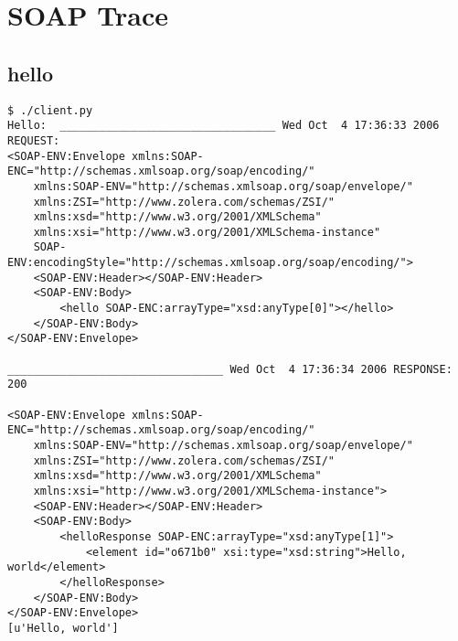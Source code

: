 \section{SOAP Trace}
\subsection{hello}
\begin{verbatim}
$ ./client.py 
Hello:  _________________________________ Wed Oct  4 17:36:33 2006 REQUEST:
<SOAP-ENV:Envelope xmlns:SOAP-ENC="http://schemas.xmlsoap.org/soap/encoding/" 
	xmlns:SOAP-ENV="http://schemas.xmlsoap.org/soap/envelope/" 
	xmlns:ZSI="http://www.zolera.com/schemas/ZSI/" 
	xmlns:xsd="http://www.w3.org/2001/XMLSchema" 
	xmlns:xsi="http://www.w3.org/2001/XMLSchema-instance" 
	SOAP-ENV:encodingStyle="http://schemas.xmlsoap.org/soap/encoding/">
	<SOAP-ENV:Header></SOAP-ENV:Header>
	<SOAP-ENV:Body>
		<hello SOAP-ENC:arrayType="xsd:anyType[0]"></hello>
	</SOAP-ENV:Body>
</SOAP-ENV:Envelope>

_________________________________ Wed Oct  4 17:36:34 2006 RESPONSE:
200

<SOAP-ENV:Envelope xmlns:SOAP-ENC="http://schemas.xmlsoap.org/soap/encoding/" 
	xmlns:SOAP-ENV="http://schemas.xmlsoap.org/soap/envelope/" 
	xmlns:ZSI="http://www.zolera.com/schemas/ZSI/" 
	xmlns:xsd="http://www.w3.org/2001/XMLSchema" 
	xmlns:xsi="http://www.w3.org/2001/XMLSchema-instance">
	<SOAP-ENV:Header></SOAP-ENV:Header>
	<SOAP-ENV:Body>
		<helloResponse SOAP-ENC:arrayType="xsd:anyType[1]">
			<element id="o671b0" xsi:type="xsd:string">Hello, world</element>
		</helloResponse>
	</SOAP-ENV:Body>
</SOAP-ENV:Envelope>
[u'Hello, world']
\end{verbatim}

